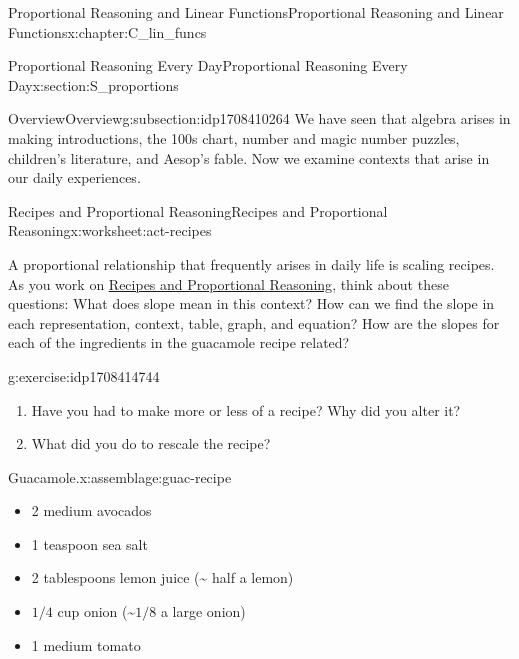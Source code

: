 \documentclass[oneside,10pt,]{book}
\numberwithin{equation}{chapter}
\begin{document}
\begin{chapterptx}{Proportional Reasoning and Linear Functions}{}{Proportional Reasoning and Linear Functions}{}{}{x:chapter:C_lin_funcs}
\begin{sectionptx}{Proportional Reasoning Every Day}{}{Proportional Reasoning Every Day}{}{}{x:section:S_proportions}
%
%
\typeout{************************************************}
\typeout{************************************************}
%
\begin{subsectionptx}{Overview}{}{Overview}{}{}{g:subsection:idp1708410264}
We have seen that algebra arises in making introductions, the 100s chart, number and magic number puzzles, children's literature, and Aesop's fable. Now we examine contexts that arise in our daily experiences.%
\end{subsectionptx}
%
%
\typeout{************************************************}
\typeout{************************************************}
%
\begin{worksheet-subsection}{Recipes and Proportional Reasoning}{}{Recipes and Proportional Reasoning}{}{}{x:worksheet:act-recipes}
\begin{introduction}{}%
A proportional relationship that frequently arises in daily life is scaling recipes. As you work on \hyperref[x:worksheet:act-recipes]{Recipes and Proportional Reasoning}, think about these questions: What does slope mean in this context? How can we find the slope in each representation, context, table, graph, and equation? How are the slopes for each of the ingredients in the guacamole recipe related?%
\end{introduction}%
\begin{divisionexercise}{1}{}{}{g:exercise:idp1708414744}%
\begin{enumerate}[font=\bfseries,label=(\alph*),ref=\alph*]
\item{}Have you had to make more or less of a recipe? Why did you alter it?%
\item{}What did you do to rescale the recipe?%
\end{enumerate}
\end{divisionexercise}%
\begin{assemblage}{Guacamole.}{x:assemblage:guac-recipe}%
%
\begin{itemize}[label=\textbullet]
\item{}2 medium avocados%
\item{}1 teaspoon sea salt%
\item{}2 tablespoons lemon juice (\textasciitilde{} half a lemon)%
\item{}\(1/4\) cup onion (\textasciitilde{}\(1/8\) a large onion)%
\item{}1 medium tomato%

\end{itemize}
\end{assemblage}
\end{worksheet-subsection}
\end{sectionptx}
\end{chapterptx}
\end{document}
